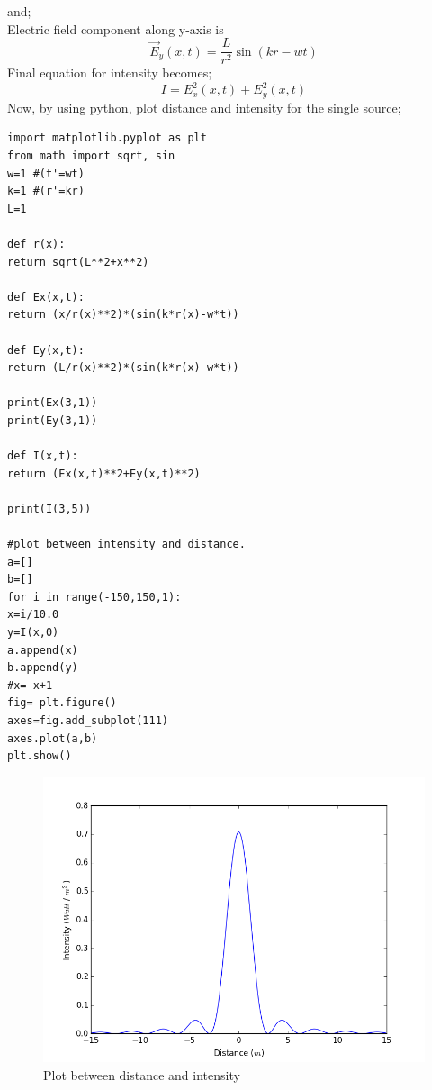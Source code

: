 \documentclass[a4paper, twoside] {thesis}
\begin{document}
and;\\
Electric field component along y-axis is\\
\begin{equation}
\vec{E}_y(x,t) = \frac{L}{r^2}\sin(kr-wt)
\end{equation}
Final equation for intensity becomes;\\
\begin{equation}
I = E_x^2(x,t)+E_y^2(x,t)
\end{equation}
Now, by using python, plot distance and intensity for the single source;\\
\begin{verbatim}
import matplotlib.pyplot as plt
from math import sqrt, sin
w=1 #(t'=wt)
k=1 #(r'=kr)
L=1

def r(x):
return sqrt(L**2+x**2)

def Ex(x,t):
return (x/r(x)**2)*(sin(k*r(x)-w*t))

def Ey(x,t):
return (L/r(x)**2)*(sin(k*r(x)-w*t))

print(Ex(3,1))
print(Ey(3,1))

def I(x,t):
return (Ex(x,t)**2+Ey(x,t)**2)

print(I(3,5))

#plot between intensity and distance.
a=[]
b=[]
for i in range(-150,150,1):
x=i/10.0
y=I(x,0)
a.append(x)
b.append(y)
#x= x+1
fig= plt.figure()
axes=fig.add_subplot(111)
axes.plot(a,b)
plt.show()
\end{verbatim}

\begin{figure}[ht]
\centering	
\includegraphics[scale=0.45]{figure_1.png}
\caption{Plot between distance and intensity}
\end{figure}
\end{document}
